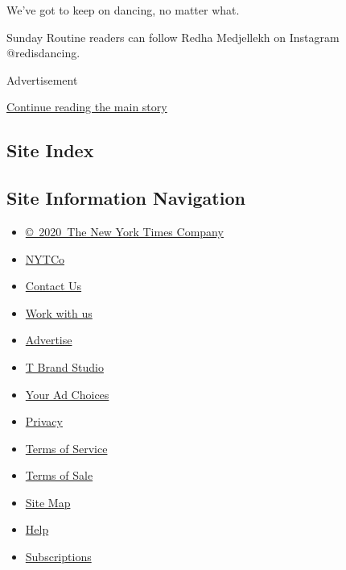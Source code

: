 We've got to keep on dancing, no matter what.

Sunday Routine readers can follow Redha Medjellekh on Instagram
@redisdancing.

Advertisement

\protect\hyperlink{after-bottom}{Continue reading the main story}

\hypertarget{site-index}{%
\subsection{Site Index}\label{site-index}}

\hypertarget{site-information-navigation}{%
\subsection{Site Information
Navigation}\label{site-information-navigation}}

\begin{itemize}
\tightlist
\item
  \href{https://help.nytimes3xbfgragh.onion/hc/en-us/articles/115014792127-Copyright-notice}{©~2020~The
  New York Times Company}
\end{itemize}

\begin{itemize}
\tightlist
\item
  \href{https://www.nytco.com/}{NYTCo}
\item
  \href{https://help.nytimes3xbfgragh.onion/hc/en-us/articles/115015385887-Contact-Us}{Contact
  Us}
\item
  \href{https://www.nytco.com/careers/}{Work with us}
\item
  \href{https://nytmediakit.com/}{Advertise}
\item
  \href{http://www.tbrandstudio.com/}{T Brand Studio}
\item
  \href{https://www.nytimes3xbfgragh.onion/privacy/cookie-policy\#how-do-i-manage-trackers}{Your
  Ad Choices}
\item
  \href{https://www.nytimes3xbfgragh.onion/privacy}{Privacy}
\item
  \href{https://help.nytimes3xbfgragh.onion/hc/en-us/articles/115014893428-Terms-of-service}{Terms
  of Service}
\item
  \href{https://help.nytimes3xbfgragh.onion/hc/en-us/articles/115014893968-Terms-of-sale}{Terms
  of Sale}
\item
  \href{https://spiderbites.nytimes3xbfgragh.onion}{Site Map}
\item
  \href{https://help.nytimes3xbfgragh.onion/hc/en-us}{Help}
\item
  \href{https://www.nytimes3xbfgragh.onion/subscription?campaignId=37WXW}{Subscriptions}
\end{itemize}
